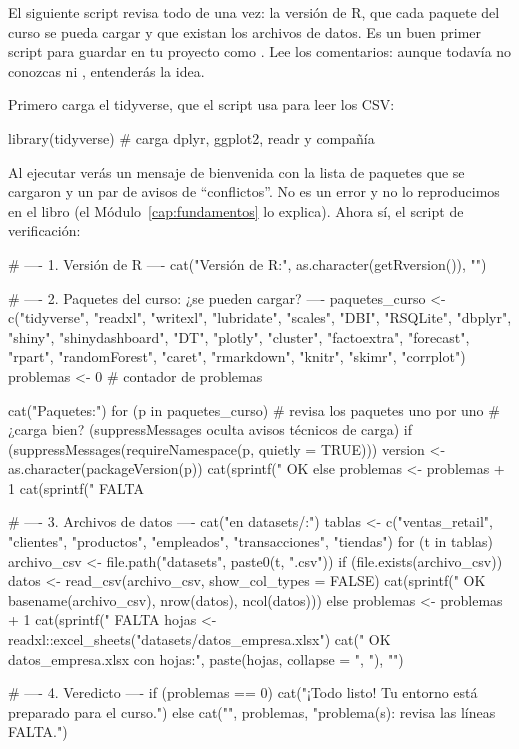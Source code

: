 El siguiente script revisa todo de una vez: la versión de R, que cada
paquete del curso se pueda cargar y que existan los archivos de datos. Es
un buen primer script para guardar en tu proyecto como
. Lee los comentarios: aunque todavía no
conozcas  ni , entenderás la idea.

Primero carga el tidyverse, que el script usa para leer los CSV:

\begin{rcode}
library(tidyverse)   # carga dplyr, ggplot2, readr y compañía
\end{rcode}

Al ejecutar  verás un mensaje de bienvenida con
la lista de paquetes que se cargaron y un par de avisos de
``conflictos''. No es un error y no lo reproducimos en el libro (el
Módulo~\ref{cap:fundamentos} lo explica). Ahora sí, el script de
verificación:

\begin{rcode}[title=Verificación del entorno del curso, colbacktitle=primario!85, coltitle=white, fonttitle=\sffamily\bfseries\small]
# ---- 1. Versión de R ----
cat("Versión de R:", as.character(getRversion()), "\n\n")

# ---- 2. Paquetes del curso: ¿se pueden cargar? ----
paquetes_curso <- c("tidyverse", "readxl", "writexl", "lubridate",
                    "scales", "DBI", "RSQLite", "dbplyr", "shiny",
                    "shinydashboard", "DT", "plotly", "cluster",
                    "factoextra", "forecast", "rpart", "randomForest",
                    "caret", "rmarkdown", "knitr", "skimr", "corrplot")
problemas <- 0                         # contador de problemas

cat("Paquetes:\n")
for (p in paquetes_curso) {            # revisa los paquetes uno por uno
  # ¿carga bien? (suppressMessages oculta avisos técnicos de carga)
  if (suppressMessages(requireNamespace(p, quietly = TRUE))) {
    version <- as.character(packageVersion(p))
    cat(sprintf("  OK     %
  } else {
    problemas <- problemas + 1
    cat(sprintf("  FALTA  %
  }
}

# ---- 3. Archivos de datos ----
cat("\nArchivos en datasets/:\n")
tablas <- c("ventas_retail", "clientes", "productos", "empleados",
            "transacciones", "tiendas")
for (t in tablas) {
  archivo_csv <- file.path("datasets", paste0(t, ".csv"))
  if (file.exists(archivo_csv)) {
    datos <- read_csv(archivo_csv, show_col_types = FALSE)
    cat(sprintf("  OK     %
                basename(archivo_csv), nrow(datos), ncol(datos)))
  } else {
    problemas <- problemas + 1
    cat(sprintf("  FALTA  %
  }
}
hojas <- readxl::excel_sheets("datasets/datos_empresa.xlsx")
cat("  OK     datos_empresa.xlsx con hojas:\n        ",
    paste(hojas, collapse = ", "), "\n")

# ---- 4. Veredicto ----
if (problemas == 0) {
  cat("\n¡Todo listo! Tu entorno está preparado para el curso.\n")
} else {
  cat("\nHay", problemas, "problema(s): revisa las líneas FALTA.\n")
}
\end{rcode}

